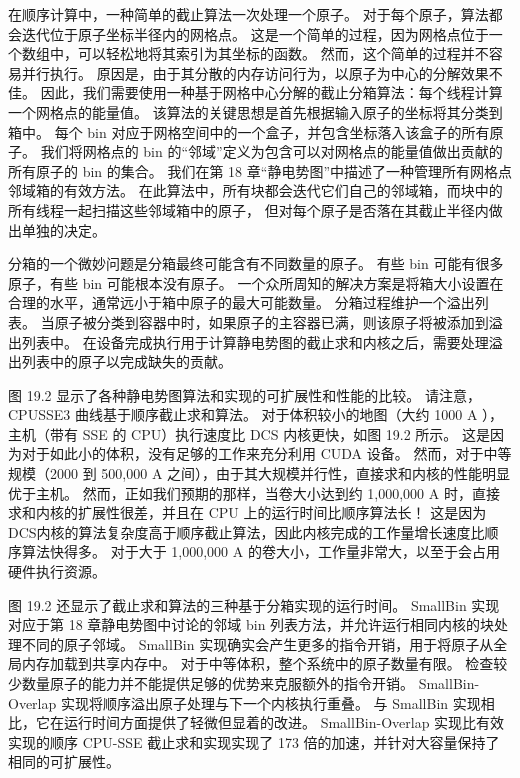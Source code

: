 在顺序计算中，一种简单的截止算法一次处理一个原子。 对于每个原子，算法都会迭代位于原子坐标半径内的网格点。 
这是一个简单的过程，因为网格点位于一个数组中，可以轻松地将其索引为其坐标的函数。 然而，这个简单的过程并不容易并行执行。 
原因是，由于其分散的内存访问行为，以原子为中心的分解效果不佳。 
因此，我们需要使用一种基于网格中心分解的截止分箱算法：每个线程计算一个网格点的能量值。 
该算法的关键思想是首先根据输入原子的坐标将其分类到箱中。 
每个 bin 对应于网格空间中的一个盒子，并包含坐标落入该盒子的所有原子。 
我们将网格点的 bin 的“邻域”定义为包含可以对网格点的能量值做出贡献的所有原子的 bin 的集合。 
我们在第 18 章“静电势图”中描述了一种管理所有网格点邻域箱的有效方法。 
在此算法中，所有块都会迭代它们自己的邻域箱，而块中的所有线程一起扫描这些邻域箱中的原子，
但对每个原子是否落在其截止半径内做出单独的决定。

分箱的一个微妙问题是分箱最终可能含有不同数量的原子。 有些 bin 可能有很多原子，有些 bin 可能根本没有原子。 
一个众所周知的解决方案是将箱大小设置在合理的水平，通常远小于箱中原子的最大可能数量。 分箱过程维护一个溢出列表。 
当原子被分类到容器中时，如果原子的主容器已满，则该原子将被添加到溢出列表中。 
在设备完成执行用于计算静电势图的截止求和内核之后，需要处理溢出列表中的原子以完成缺失的贡献。

图 19.2 显示了各种静电势图算法和实现的可扩展性和性能的比较。 请注意，CPUSSE3 曲线基于顺序截止求和算法。 
对于体积较小的地图（大约 1000 A ），主机（带有 SSE 的 CPU）执行速度比 DCS 内核更快，如图 19.2 所示。 
这是因为对于如此小的体积，没有足够的工作来充分利用 CUDA 设备。 
然而，对于中等规模（2000 到 500,000 A 之间），由于其大规模并行性，直接求和内核的性能明显优于主机。 
然而，正如我们预期的那样，当卷大小达到约 1,000,000 A 时，直接求和内核的扩展性很差，并且在 CPU 上的运行时间比顺序算法长！ 
这是因为DCS内核的算法复杂度高于顺序截止算法，因此内核完成的工作量增长速度比顺序算法快得多。 
对于大于 1,000,000 A 的卷大小，工作量非常大，以至于会占用硬件执行资源。

图 19.2 还显示了截止求和算法的三种基于分箱实现的运行时间。 
SmallBin 实现对应于第 18 章静电势图中讨论的邻域 bin 列表方法，并允许运行相同内核的块处理不同的原子邻域。 
SmallBin 实现确实会产生更多的指令开销，用于将原子从全局内存加载到共享内存中。 
对于中等体积，整个系统中的原子数量有限。 检查较少数量原子的能力并不能提供足够的优势来克服额外的指令开销。 
SmallBin-Overlap 实现将顺序溢出原子处理与下一个内核执行重叠。 
与 SmallBin 实现相比，它在运行时间方面提供了轻微但显着的改进。 
SmallBin-Overlap 实现比有效实现的顺序 CPU-SSE 截止求和实现实现了 173 倍的加速，并针对大容量保持了相同的可扩展性。

